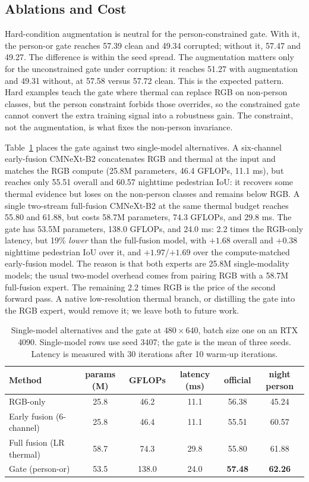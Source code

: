 \subsection{Ablations and Cost}

Hard-condition augmentation is neutral for the person-constrained gate. With it, the
person-or gate reaches 57.39 clean and 49.34 corrupted; without it, 57.47 and 49.27.
The difference is within the seed spread. The augmentation matters only for the
unconstrained gate under corruption: it reaches 51.27 with augmentation and 49.31
without, at 57.58 versus 57.72 clean. This is the expected pattern. Hard examples teach
the gate where thermal can replace RGB on non-person classes, but the person constraint
forbids those overrides, so the constrained gate cannot convert the extra training
signal into a robustness gain. The constraint, not the augmentation, is what fixes the
non-person invariance.

Table~\ref{tab:compute} places the gate against two single-model alternatives. A
six-channel early-fusion CMNeXt-B2 concatenates RGB and thermal at the input and matches the RGB compute
(25.8M parameters, 46.4 GFLOPs, 11.1 ms), but reaches only
55.51 overall and 60.57 nighttime pedestrian IoU: it recovers some thermal evidence but
loses on the non-person classes and remains below RGB. A single two-stream full-fusion
CMNeXt-B2 at the same thermal budget reaches 55.80 and 61.88, but costs 58.7M parameters, 74.3 GFLOPs, and 29.8 ms.
The gate has 53.5M parameters, 138.0 GFLOPs, and 24.0 ms: 2.2 times the RGB-only
latency, but 19\% \emph{lower} than the full-fusion model, with $+1.68$ overall and
$+0.38$ nighttime pedestrian IoU over it, and $+1.97$/$+1.69$ over the compute-matched
early-fusion model. The reason is that both experts are 25.8M single-modality models;
the usual two-model overhead comes from pairing RGB with a 58.7M full-fusion expert. The
remaining 2.2 times RGB is the price of the second forward pass. A native low-resolution
thermal branch, or distilling the gate into the RGB expert, would remove it; we leave
both to future work.

\begin{table}[t]
\centering
\caption{Single-model alternatives and the gate at $480\times640$, batch size one on an
RTX 4090. Single-model rows use seed 3407; the gate is the mean of three seeds. Latency
is measured with 30 iterations after 10 warm-up iterations.}
\label{tab:compute}
\begin{tabular}{lccccc}
\toprule
Method & params (M) & GFLOPs & latency (ms) & official & night person \\
\midrule
RGB-only & 25.8 & 46.2 & 11.1 & 56.38 & 45.24 \\
Early fusion (6-channel) & 25.8 & 46.4 & 11.1 & 55.51 & 60.57 \\
Full fusion (LR thermal) & 58.7 & 74.3 & 29.8 & 55.80 & 61.88 \\
Gate (person-or) & 53.5 & 138.0 & 24.0 & \textbf{57.48} & \textbf{62.26} \\
\bottomrule
\end{tabular}
\end{table}
